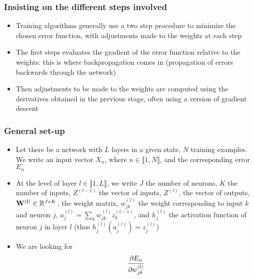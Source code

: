 \documentclass{beamer}
\begin{document}
\begin{frame}
	\frametitle{Insisting on the different steps involved}
    \begin{itemize}
    	\item Training algorithms generally use a two step procedure to minimize the chosen error function, with adjustments made to the weights at each step
        \item The first steps evaluates the gradient of the error function relative to the weights: this is where backpropagation comes in (propagation of errors backwards through the network)
        \item Then adjustments to be made to the weights are computed using the derivatives obtained in the previous stage, often using a version of gradient descent 
  \end{itemize}
\end{frame}

\begin{frame}
	\frametitle{General set-up}
    \begin{itemize}
    	\item Let there be a network with $L$ layers in a given state, $N$ training examples. We write an input vector $X_n$, where $n \in \llbracket 1, N\rrbracket$, and the corresponding error $E_n$
        \item At the level of layer $l \in \llbracket 1, L\rrbracket $, we write $J$ the number of neurons, $K$ the number of inputs, $Z^{(l-1)}$ the vector of inputs, $Z^{(l)}$, the vector of outputs, $\vb{W^{(l)}} \in \mathbb{R}^{JxK}$, the weight matrix,  $w^{(l)}_{jk}$ the weight corresponding to input $k$ and neuron $j$, $a^{(l)}_j = \sum_{k}w^{(l)}_{jk}z^{(l-1)}_k$, and $h^{(l)}_j$ the activation function of neuron $j$ in layer $l$ (thus $h^{(l)}_j(a^{(l)}_j) = z^{(l)}_j$)
        \item We are looking for \color{red}
        \begin{equation}
        \pdv{E_n}{w^{(l)}_{jk}}
        \end{equation}
        \end{itemize}
\end{frame}
\end{document}
